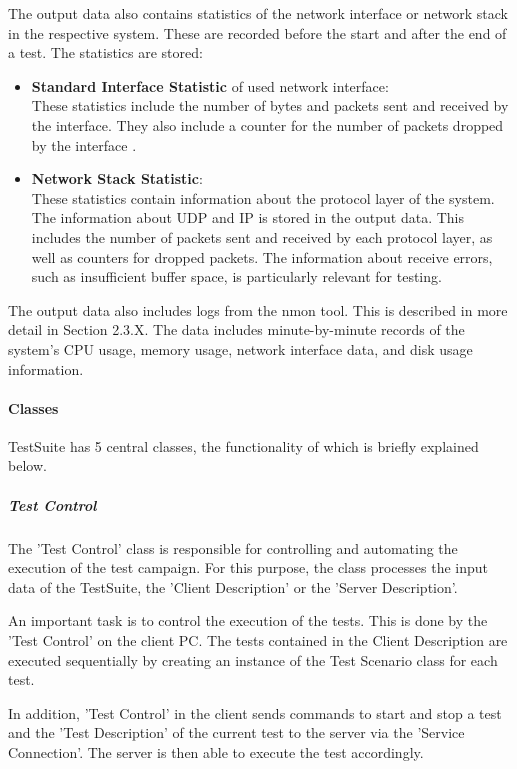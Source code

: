 The output data also contains statistics of the network interface or network stack in the respective system. These are recorded before the start and after the end of a test. The statistics are stored:
\begin{itemize}
	\item \textbf{Standard Interface Statistic} of used network interface: \\
	These statistics include the number of bytes and packets sent and received by the interface. They also include a counter for the number of packets dropped by the interface \cite{tsd03}.
	\item \textbf{Network Stack Statistic}: \\
	These statistics contain information about the protocol layer of the system. The information about UDP and IP is stored in the output data. This includes the number of packets sent and received by each protocol layer, as well as counters for dropped packets. The information about receive errors, such as insufficient buffer space, is particularly relevant for testing.
\end{itemize}

The output data also includes logs from the nmon tool. This is described in more detail in Section 2.3.X. The data includes minute-by-minute records of the system's CPU usage, memory usage, network interface data, and disk usage information.

\paragraph{Classes}
TestSuite has 5 central classes, the functionality of which is briefly explained below.

\subparagraph{Test Control}
The 'Test Control' class is responsible for controlling and automating the execution of the test campaign. For this purpose, the class processes the input data of the TestSuite, the 'Client Description' or the 'Server Description'.

An important task is to control the execution of the tests. This is done by the 'Test Control' on the client PC. The tests contained in the Client Description are executed sequentially by creating an instance of the Test Scenario class for each test.

In addition, 'Test Control' in the client sends commands to start and stop a test and the 'Test Description' of the current test to the server via the 'Service Connection'. The server is then able to execute the test accordingly.

